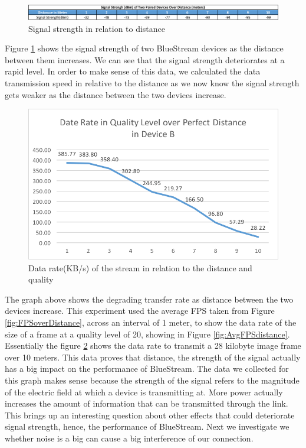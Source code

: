 \documentclass[a4paper,12pt]{article}
\begin{document}
\begin{figure}[h!]
\centering
\includegraphics[scale=.55]{Figures/Figure15.png}
\caption{Signal strength in relation to distance}
\label{fig:SignalStrength}
\end{figure}

Figure \ref{fig:SignalStrength} shows the signal strength of two BlueStream devices as the distance between them increases. We can see that the signal strength deteriorates at a rapid level. In order to make sense of this data, we calculated the data transmission speed in relative to the distance as we now know the signal strength gets weaker as the distance between the two devices increase.


\begin{figure}[h!]
\centering
\includegraphics[scale=1]{Figures/Figure16.png}
\caption{Data rate(KB/s) of the stream in relation to the distance and quality}
\label{fig:DataRateDistance}
\end{figure}

The graph above shows the degrading transfer rate as distance between the two devices increase. This experiment used the average FPS taken from Figure \ref{fig:FPSoverDistance}, across an interval of 1 meter, to show the data rate of the size of a frame at a quality level of 20, showing in Figure \ref{fig:AvgFPSdistance}. Essentially the figure \ref{fig:DataRateDistance} shows the data rate to transmit a 28 kilobyte image frame over 10 meters. This data proves that distance, the strength of the signal actually has a big impact on the performance of BlueStream. The data we collected for this graph makes sense because the strength of the signal refers to the magnitude of the electric field at which a device is transmitting at. More power actually increases the amount of information that can be transmitted through the link. This brings up an interesting question about other effects that could deteriorate signal strength, hence, the performance of BlueStream. Next we investigate we whether noise is a big can cause a big interference of our connection.
\end{document}
